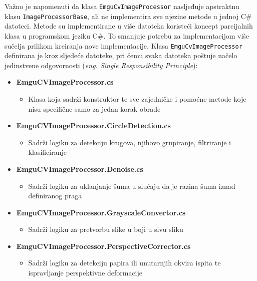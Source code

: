 \documentclass{foi}
\begin{document}
Važno je napomenuti da klasa \texttt{EmguCvImageProcessor} nasljeđuje apstraktnu klasu \texttt{ImageProcessorBase}, ali ne implementira sve njezine metode u jednoj C\# datoteci. Metode su implementirane u više datoteka koristeći koncept parcijalnih klasa u programskom jeziku C\#. To smanjuje potrebu za implementacijom više sučelja prilikom kreiranja nove implementacije. Klasa \texttt{EmguCvImageProcessor} definirana je kroz sljedeće datoteke, pri čemu svaka datoteka poštuje načelo jedinstvene odgovornosti (\textit{eng. Single Responsibility Principle}):

\begin{itemize}
    \item \textbf{EmguCVImageProcessor.cs}
    \begin{itemize}
        \item Klasa koja sadrži konstruktor te sve zajedničke i pomoćne metode koje nisu specifične samo za jedan korak obrade
    \end{itemize}
    
    \item \textbf{EmguCVImageProcessor.CircleDetection.cs}
    \begin{itemize}
        \item Sadrži logiku za detekciju krugova, njihovo grupiranje, filtriranje i klasificiranje
    \end{itemize}

    \item \textbf{EmguCVImageProcessor.Denoise.cs}
    \begin{itemize}
        \item Sadrži logiku za uklanjanje šuma u slučaju da je razina šuma iznad definiranog praga
    \end{itemize}

    \item \textbf{EmguCVImageProcessor.GrayscaleConvertor.cs}
    \begin{itemize}
        \item Sadrži logiku za pretvorbu slike u boji u sivu sliku
    \end{itemize}

    \item \textbf{EmguCVImageProcessor.PerspectiveCorrector.cs}
    \begin{itemize}
        \item Sadrži logiku za detekciju papira ili unutarnjih okvira ispita te ispravljanje perspektivne deformacije
    \end{itemize}


\end{itemize}
\end{document}
